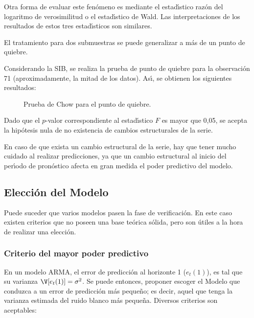 Otra forma de evaluar este fen\'{o}meno es mediante el estad\'{\i}stico 
raz\'{o}n del logaritmo de verosimilitud o el estad\'{\i}stico de Wald. Las 
interpretaciones de los resultados de estos tres estad\'{\i}sticos son 
similares. 

\begin{observacion}
El tratamiento para dos submuestras se puede generalizar a m\'{a}s de un punto de quiebre. 
\end{observacion}

\begin{ejemplo}
Considerando la SIB, se realiza la prueba de punto de quiebre para la observaci\'{o}n 71 (aproximadamente, la mitad de los datos). As\'{\i}, se obtienen los siguientes resultados:

\begin{figure}[H]
\centering
\caption{Prueba de Chow para el punto de quiebre.}
\end{figure}

Dado que el $p$-valor correspondiente al estad\'{\i}stico $F$ es mayor que 
0,05, se acepta la hip\'{o}tesis nula de no existencia de cambios 
estructurales de la serie.
\end{ejemplo}

\begin{observacion}
En caso de que exista un cambio estructural de la serie, hay que tener mucho cuidado al realizar predicciones, ya que un cambio estructural al inicio del per\'{\i}odo de pron\'{o}stico afecta en gran medida el poder predictivo del modelo. 
\end{observacion}



\subsection{Elecci\'{o}n del Modelo}

Puede suceder que varios modelos pasen la fase de verificaci\'{o}n. En este 
caso existen criterios que no poseen una base te\'{o}rica s\'{o}lida, pero 
son \'{u}tiles a la hora de realizar una elecci\'{o}n.

\subsubsection{Criterio del mayor poder predictivo}

En un modelo ARMA, el error de predicci\'{o}n al horizonte 1 ($e_{t}(1)$), es tal que su varianza $\V[e_{t}(1)]=\sigma^{2}$. Se puede entonces, proponer escoger el 
Modelo que conduzca a un error de predicci\'{o}n m\'{a}s peque\~{n}o; es 
decir, aquel que tenga la varianza estimada del ruido blanco m\'{a}s 
peque\~{n}a. Diversos criterios son aceptables:

